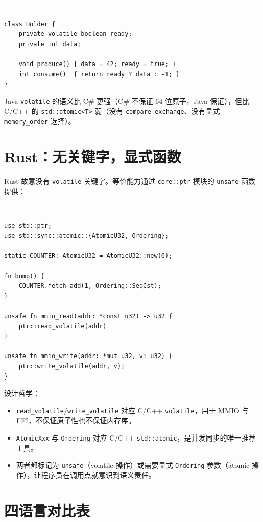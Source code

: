 \documentclass[12pt,a4paper,fontset=fandol]{ctexbook}
\newcommand{\javalabel}{%
  \begin{tcolorbox}[enhanced,colback=javaheadbg,colframe=javaheadbg,
    arc=1mm,boxrule=0mm,left=6pt,right=6pt,top=2pt,bottom=2pt,
    halign=left,oversize]
    \textcolor{white}{\small\bfseries Java}
  \end{tcolorbox}\vspace{-4pt}}
\newcommand{\rustlabel}{%
  \begin{tcolorbox}[enhanced,colback=rustheadbg,colframe=rustheadbg,
    arc=1mm,boxrule=0mm,left=6pt,right=6pt,top=2pt,bottom=2pt,
    halign=left,oversize]
    \textcolor{white}{\small\bfseries Rust}
  \end{tcolorbox}\vspace{-4pt}}
\newcommand{\cpp}[1]{C++#1}
\newcommand{\kw}[1]{\texttt{#1}}
\begin{document}
\javalabel
\begin{lstlisting}[style=javastyle]
class Holder {
    private volatile boolean ready;
    private int data;

    void produce() { data = 42; ready = true; }
    int consume()  { return ready ? data : -1; }
}
\end{lstlisting}

Java \kw{volatile} 的语义比 C\# 更强（C\# 不保证 64 位原子，Java 保证），但比 C/\allowbreak{}\cpp{} 的 \texttt{std::atomic<T>} 弱（没有 \texttt{compare\_exchange}、没有显式 \texttt{memory\_order} 选择）。

\section{Rust：无关键字，显式函数}\label{sec:rust-volatile}

Rust 故意没有 \kw{volatile} 关键字。等价能力通过 \texttt{core::ptr} 模块的 \texttt{unsafe} 函数提供：

\rustlabel
\begin{lstlisting}[style=ruststyle]
use std::ptr;
use std::sync::atomic::{AtomicU32, Ordering};

static COUNTER: AtomicU32 = AtomicU32::new(0);

fn bump() {
    COUNTER.fetch_add(1, Ordering::SeqCst);
}

unsafe fn mmio_read(addr: *const u32) -> u32 {
    ptr::read_volatile(addr)
}

unsafe fn mmio_write(addr: *mut u32, v: u32) {
    ptr::write_volatile(addr, v);
}
\end{lstlisting}

设计哲学：

\begin{itemize}[nosep]
  \item \texttt{read\_volatile}/\allowbreak{}\texttt{write\_volatile} 对应 C/\allowbreak{}\cpp{} \kw{volatile}，用于 MMIO 与 FFI，不保证原子性也不保证内存序。
  \item \texttt{AtomicXxx} 与 \texttt{Ordering} 对应 C/\allowbreak{}\cpp{} \texttt{std::atomic}，是并发同步的唯一推荐工具。
  \item 两者都标记为 \texttt{unsafe}（volatile 操作）或需要显式 \texttt{Ordering} 参数（atomic 操作），让程序员在调用点就意识到语义责任。
\end{itemize}

\section{四语言对比表}\label{sec:cross-table}
\end{document}
